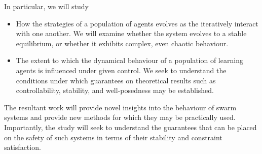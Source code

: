 \documentclass[.../main.tex]{subfiles}
\begin{document}
    In particular, we will study

    \begin{itemize}
    	\item How the strategies of a population of agents evolves as the iteratively interact
    	with one another. We will examine whether the system evolves to a stable equilibrium, or
    	whether it exhibits complex, even chaotic behaviour.
    	\item The extent to which the dynamical behaviour of a population of learning agents is
    	influenced under given control. We seek to understand the conditions under which guarantees
    	on theoretical results such as controllability, stability, and well-posedness may be
    	established.
    \end{itemize}

    The resultant work will provide novel insights into the behaviour of swarm systems and provide
    new methods for which they may be practically used. Importantly, the study will seek to
    understand the guarantees that can be placed on the safety of such systems in terms of their
    stability and constraint satisfaction.

\end{document}
